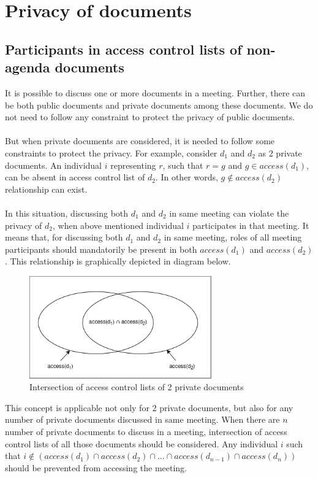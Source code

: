 \section{Privacy of documents}
\subsection{Participants in access control lists of non-agenda documents}
\noindent
It is possible to discuss one or more documents in a meeting. Further, there can be both public documents and private documents among these documents. We do not need to follow any constraint to protect the privacy of public documents.\\ \\
But when private documents are considered, it is needed to follow some constraints to protect the privacy. For example, consider $d_{1}$ and $d_{2}$ as 2 private documents. An individual $i$ representing $r$, such that $r = g$ and $g \in access(d_{1})$, can be absent in access control list of $d_{2}$. In other words, $g \notin access(d_{2})$ relationship can exist.\\ \\
In this situation, discussing both $d_{1}$ and $d_{2}$ in same meeting can violate the privacy of $d_{2}$, when above mentioned individual $i$ participates in that meeting. It means that, for discussing both $d_{1}$ and $d_{2}$ in same meeting, roles of all meeting participants should mandatorily be present in both $access(d_{1})$ and $access(d_{2})$. This relationship is graphically depicted in diagram below.
\begin{figure}[H]
    \centering
    \includegraphics[width=0.7\textwidth]{./image/d1_intersection_d2.png}
    \caption{Intersection of access control lists of 2 private documents}
    \label{fig:intersection of access control lists of 2 private documents}
\end{figure} 
\noindent
This concept is applicable not only for 2 private documents, but also for any number of private documents discussed in same meeting. When there are $n$ number of private documents to discuss in a meeting, intersection of access control lists of all those documents should be considered. Any individual $i$ such that $i \notin (access(d_{1}) \cap access(d_{2}) \cap ... \cap access(d_{n-1}) \cap access(d_{n}))$ should be prevented from accessing the meeting.
